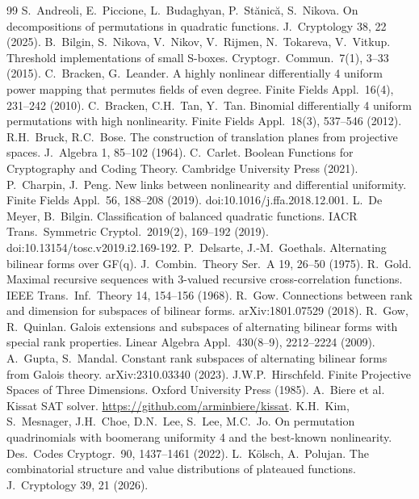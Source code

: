 \documentclass[11pt]{article}
\theoremstyle{definition}
\begin{document}
\begin{thebibliography}{99}
 S.~Andreoli, E.~Piccione, L.~Budaghyan, P.~St\u{a}nic\u{a}, S.~Nikova.
On decompositions of permutations in quadratic functions. J.\ Cryptology 38, 22 (2025).
 B.~Bilgin, S.~Nikova, V.~Nikov, V.~Rijmen, N.~Tokareva, V.~Vitkup. Threshold
implementations of small S-boxes. Cryptogr.\ Commun.\ 7(1), 3--33 (2015).
 C.~Bracken, G.~Leander. A highly nonlinear differentially 4 uniform power
mapping that permutes fields of even degree. Finite Fields Appl.\ 16(4), 231--242 (2010).
 C.~Bracken, C.H.~Tan, Y.~Tan. Binomial differentially 4 uniform permutations with
high nonlinearity. Finite Fields Appl.\ 18(3), 537--546 (2012).
 R.H.~Bruck, R.C.~Bose. The construction of translation planes from projective
spaces. J.\ Algebra 1, 85--102 (1964).
 C.~Carlet. Boolean Functions for Cryptography and Coding Theory. Cambridge
University Press (2021).
 P.~Charpin, J.~Peng. New links between nonlinearity and differential uniformity.
Finite Fields Appl.\ 56, 188--208 (2019). doi:10.1016/j.ffa.2018.12.001.
 L.~De Meyer, B.~Bilgin. Classification of balanced quadratic functions. IACR
Trans.\ Symmetric Cryptol.\ 2019(2), 169--192 (2019). doi:10.13154/tosc.v2019.i2.169-192.
 P.~Delsarte, J.-M.~Goethals. Alternating bilinear forms over GF(q). J.\ Combin.\
Theory Ser.\ A 19, 26--50 (1975).
 R.~Gold. Maximal recursive sequences with 3-valued recursive cross-correlation
functions. IEEE Trans.\ Inf.\ Theory 14, 154--156 (1968).
 R.~Gow. Connections between rank and dimension for subspaces of bilinear forms.
arXiv:1801.07529 (2018).
 R.~Gow, R.~Quinlan. Galois extensions and subspaces of alternating bilinear forms
with special rank properties. Linear Algebra Appl.\ 430(8--9), 2212--2224 (2009).
\bibitem{GM23} A.~Gupta, S.~Mandal. Constant rank subspaces of alternating bilinear forms from
Galois theory. arXiv:2310.03340 (2023).
 J.W.P.~Hirschfeld. Finite Projective Spaces of Three Dimensions. Oxford University
Press (1985).
 A.~Biere et al. Kissat SAT solver. \url{https://github.com/arminbiere/kissat}.
\bibitem{KMCLLJ22} K.H.~Kim, S.~Mesnager, J.H.~Choe, D.N.~Lee, S.~Lee, M.C.~Jo. On permutation
quadrinomials with boomerang uniformity 4 and the best-known nonlinearity. Des.\ Codes Cryptogr.\
90, 1437--1461 (2022).
\bibitem{KP} L.~K\"olsch, A.~Polujan. The combinatorial structure and value distributions of
plateaued functions. J.\ Cryptology 39, 21 (2026).

\end{thebibliography}
\end{document}
